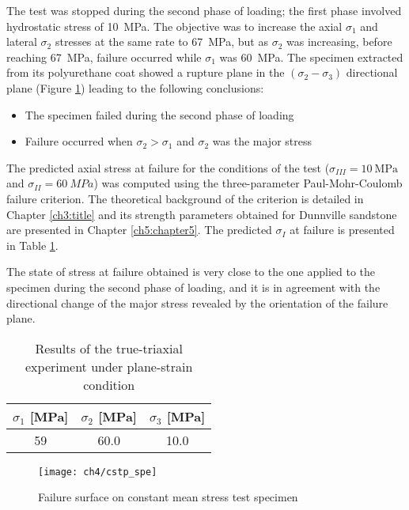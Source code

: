 The test was stopped during the second phase of loading; the first phase involved hydrostatic stress of \SI{10}{MPa}. The objective was to increase the axial $\sigma_1$ and lateral $\sigma_2$ stresses at the same rate to \SI{67}{MPa}, but as $\sigma_2$  was increasing, before reaching \SI{67}{MPa}, failure occurred while $\sigma_1$ was \SI{60}{MPa}. The specimen extracted from its polyurethane coat showed a rupture plane in the $(\sigma_{2}-\sigma_{3})$ directional plane (Figure \ref{fig4:ctsp_spe}) leading to the following conclusions:
\begin{itemize}
    \item The specimen failed during the second phase of loading
    \item Failure occurred when $\sigma_2>\sigma_1$ and $\sigma_{2}$ was the major stress
\end{itemize}
The predicted axial stress at failure for the conditions of the test ($\sigma_{III}=\SI{10}{\mega\pascal}$ and $\sigma_{II}=\SI{60}{MPa}$) was computed using the three-parameter Paul-Mohr-Coulomb failure criterion. The theoretical background of the criterion is detailed in Chapter \ref{ch3:title} and its strength parameters obtained for Dunnville sandstone are presented in Chapter \ref{ch5:chapter5}. The predicted $\sigma_I$ at failure is presented in Table \ref{tb4:TT3_sol}.

The state of stress at failure obtained is very close to the one applied to the specimen during the second phase of loading, and  it is in agreement with the directional change of the major stress revealed by the orientation of the failure plane.

\begin{table}[t!]
    \centering
    \captionsetup{justification=centering}
    \caption{Results of the true-triaxial experiment under plane-strain condition}
    \begin{tabular}{ccc}
        \hline
        $\sigma_1$ [\si{MPa}] & $\sigma_2$ [\si{MPa}] & $\sigma_3$ [\si{MPa}] \\
        \hline
        \hline
        59 & 60.0 & 10.0 \\
        \hline
    \end{tabular}
    \label{tb4:TT3_sol}
\end{table}

\begin{figure}[b!]
    \centering
    \texttt{[image: ch4/cstp\_spe]}
    \captionsetup{justification=centering}
    \caption{Failure surface on constant mean stress test specimen}
    \label{fig4:ctsp_spe}
\end{figure}